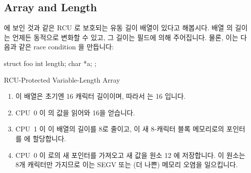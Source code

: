 \fi

\FloatBarrier
\subsection{Array and Length}
\label{sec:together:Array and Length}

 에 보인 것과 같은
RCU 로 보호되는 유동 길이 배열이 있다고 해봅시다.
배열  의 길이는 언제든 동적으로 변화할 수 있고, 그 길이는
 필드에 의해 주어집니다.
물론, 이는 다음과 같은 race condition 을 만듭니다:

\iffalse

Suppose we have an RCU-protected variable-length array, as shown in
\cref{lst:together:RCU-Protected Variable-Length Array}.
The length of the array \co{->a[]} can change dynamically, and at any
given time, its length is given by the field \co{->length}.
Of course, this introduces the following race condition:

\fi

\begin{listing}[tbp]
\begin{VerbatimL}[tabsize=8]
struct foo {
	int length;
	char *a;
};
\end{VerbatimL}
\caption{RCU-Protected Variable-Length Array}
\label{lst:together:RCU-Protected Variable-Length Array}
\end{listing}

\begin{enumerate}
\item	이 배열은 초기엔 16 캐릭터 길이이며, 따라서  는 16 입니다.
\item	CPU~0 이  의 값을 읽어와 16을 얻습니다.
\item	CPU~1 이 이 배열의 길이를 8로 줄이고, 이 새 8-캐릭터 블록 메모리로의
	포인터를  에 할당합니다.
\item	CPU~0 이  로의 새 포인터를 가져오고 새 값을 원소 12 에
	저장합니다.
	이 원소는 8개 캐릭터만 가지므로 이는 SEGV 또는 (더 나쁜) 메모리 오염을
	일으킵니다.

\iffalse

\item	The array is initially 16 characters long, and thus \co{->length}
	is equal to 16.
\item	CPU~0 loads the value of \co{->length}, obtaining the value 16.
\item	CPU~1 shrinks the array to be of length 8, and assigns a pointer
	to a new 8-character block of memory into \co{->a[]}.
\item	CPU~0 picks up the new pointer from \co{->a[]}, and stores a
	new value into element 12.
	Because the array has only 8 characters, this results in
	a SEGV or (worse yet) memory corruption.

\fi

\end{enumerate}

